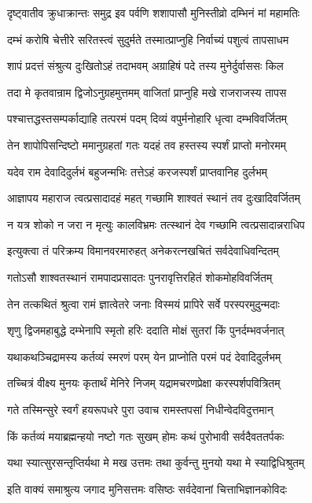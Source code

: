 \twolineshloka
{दृष्ट्वातीव क्रुधाक्रान्तः समुद्र इव पर्वणि}
{शशापासौ मुनिस्तीव्रो दम्भिनं मां महामतिः}%

\twolineshloka
{दम्भं करोषि चेत्तीरे सरितस्त्वं सुदुर्मते}
{तस्मात्प्राप्नुहि निर्वाच्यं पशुत्वं तापसाधम}%

\twolineshloka
{शापं प्रदत्तं संश्रुत्य दुःखितोऽहं तदाभवम्}
{अग्राहिषं पदे तस्य मुनेर्दुर्वाससः किल}%

\twolineshloka
{तदा मे कृतवान्राम द्विजोऽनुग्रहमुत्तमम्}
{वाजितां प्राप्नुहि मखे राजराजस्य तापस}%

\twolineshloka
{पश्चात्तद्धस्तसम्पर्काद्याहि तत्परमं पदम्}
{दिव्यं वपुर्मनोहारि धृत्वा दम्भविवर्जितम्}%

\twolineshloka
{तेन शापोपिसन्दिष्टो ममानुग्रहतां गतः}
{यदहं तव हस्तस्य स्पर्शं प्राप्तो मनोरमम्}%

\twolineshloka
{यदेव राम देवादिदुर्लभं बहुजन्मभिः}
{तत्तेऽहं करजस्पर्शं प्राप्तवानिह दुर्लभम्}%

\twolineshloka
{आज्ञापय महाराज त्वत्प्रसादादहं महत्}
{गच्छामि शाश्वतं स्थानं तव दुःखादिवर्जितम्}%

\twolineshloka
{न यत्र शोको न जरा न मृत्युः कालविभ्रमः}
{तत्स्थानं देव गच्छामि त्वत्प्रसादान्नराधिप}%

\twolineshloka
{इत्युक्त्वा तं परिक्रम्य विमानवरमारुहत्}
{अनेकरत्नखचितं सर्वदेवाधिवन्दितम्}%

\twolineshloka
{गतोऽसौ शाश्वतस्थानं रामपादप्रसादतः}
{पुनरावृत्तिरहितं शोकमोहविवर्जितम्}%

\twolineshloka
{तेन तत्कथितं श्रुत्वा रामं ज्ञात्वेतरे जनाः}
{विस्मयं प्रापिरे सर्वे परस्परमुदुन्मदाः}%

\twolineshloka
{शृणु द्विजमहाबुद्धे दम्भेनापि स्मृतो हरिः}
{ददाति मोक्षं सुतरां किं पुनर्दम्भवर्जनात्}%

\twolineshloka
{यथाकथञ्चिद्रामस्य कर्तव्यं स्मरणं परम्}
{येन प्राप्नोति परमं पदं देवादिदुर्लभम्}%

\twolineshloka
{तच्चित्रं वीक्ष्य मुनयः कृतार्थं मेनिरे निजम्}
{यद्रामचरणप्रेक्षा करस्पर्शपवित्रितम्}%

\twolineshloka
{गते तस्मिन्सुरे स्वर्गं हयरूपधरे पुरा}
{उवाच रामस्तपसां निधीन्वेदविदुत्तमान्}%

\twolineshloka
{किं कर्तव्यं मयाब्रह्मन्हयो नष्टो गतः सुखम्}
{होमः कथं पुरोभावी सर्वदैवततर्पकः}%

\twolineshloka
{यथा स्यात्सुरसन्तृप्तिर्यथा मे मख उत्तमः}
{तथा कुर्वन्तु मुनयो यथा मे स्याद्विधिश्रुतम्}%

\twolineshloka
{इति वाक्यं समाश्रुत्य जगाद मुनिसत्तमः}
{वसिष्ठः सर्वदेवानां चित्ताभिज्ञानकोविदः}%

